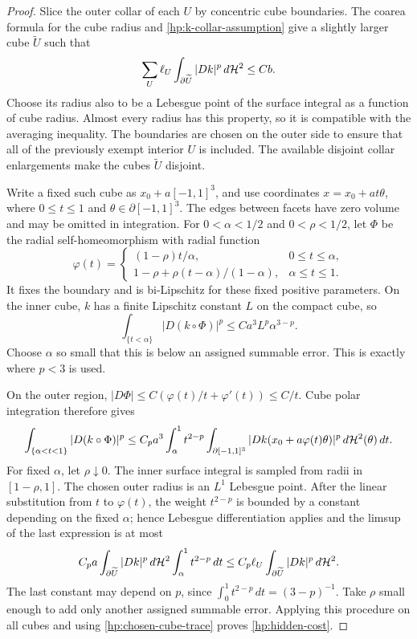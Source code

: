 \begin{proof}
Slice the outer collar of each $U$ by concentric cube boundaries.
The coarea formula for the cube radius and
\eqref{hp:k-collar-assumption} give a slightly larger cube
$\widetilde U$ such that
\begin{equation}\label{hp:chosen-cube-trace}
 \sum_U\ell_U\int_{\partial\widetilde U}|Dk|^p\,d\mathcal H^2
                   \leq Cb.
\end{equation}
Choose its radius also to be a Lebesgue point of the surface integral
as a function of cube radius.  Almost every radius has this property,
so it is compatible with the averaging inequality.  The boundaries
are chosen on the outer side to ensure that all of the previously
exempt interior $U$ is included.  The available disjoint collar
enlargements make the cubes $\widetilde U$ disjoint.

Write a fixed such cube as $x_0+a[-1,1]^3$, and use coordinates
$x=x_0+at\theta$, where $0\leq t\leq1$ and
$\theta\in\partial[-1,1]^3$.  The edges between facets have zero
volume and may be omitted in integration.  For $0<\alpha<1/2$
and $0<\rho<1/2$, let $\Phi$ be the radial self-homeomorphism
with radial function
\[
 \varphi(t)=
 \begin{cases}
 (1-\rho)t/\alpha,&0\leq t\leq\alpha,\\[2pt]
 1-\rho+\rho(t-\alpha)/(1-\alpha),&\alpha\leq t\leq1.
 \end{cases}
\]
It fixes the boundary and is bi-Lipschitz for these fixed positive
parameters.  On the inner cube, $k$ has a finite Lipschitz constant
$L$ on the compact cube, so
\[
 \int_{\{t<\alpha\}}|D(k\circ\Phi)|^p
                  \leq C a^3 L^p\alpha^{3-p}.
\]
Choose $\alpha$ so small that this is below an assigned summable
error.  This is exactly where $p<3$ is used.

On the outer region,
$|D\Phi|\leq C(\varphi(t)/t+\varphi'(t))\leq C/t$.
Cube polar integration therefore gives
\[
 \int_{\{\alpha<t<1\}}|D(k\circ\Phi)|^p
 \leq C_pa^3\int_\alpha^1t^{2-p}
       \int_{\partial[-1,1]^3}
          |Dk(x_0+a\varphi(t)\theta)|^p\,d\mathcal H^2(\theta)\,dt.
\]
For fixed $\alpha$, let $\rho\downarrow0$.  The inner surface
integral is sampled from radii in $[1-\rho,1]$.  The chosen outer
radius is an $L^1$ Lebesgue point.  After the linear substitution
from $t$ to $\varphi(t)$, the weight $t^{2-p}$ is bounded by a
constant depending on the fixed $\alpha$; hence Lebesgue
differentiation applies and the limsup of the last expression is
at most
\[
 C_pa\int_{\partial\widetilde U}|Dk|^p\,d\mathcal H^2
                   \int_\alpha^1t^{2-p}\,dt
 \leq C_p\ell_U\int_{\partial\widetilde U}|Dk|^p\,d\mathcal H^2.
\]
The last constant may depend on $p$, since
$\int_0^1t^{2-p}\,dt=(3-p)^{-1}$.  Take $\rho$ small enough to
add only another assigned summable error.  Applying this procedure
on all cubes and using \eqref{hp:chosen-cube-trace} proves
\eqref{hp:hidden-cost}.


\end{proof}
